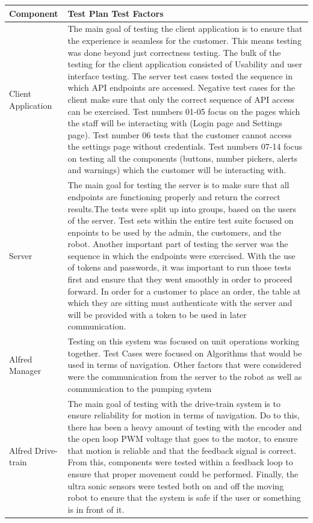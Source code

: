 \documentclass [10pt]{article}
\begin{document}
	\begin{longtable}{| p{} | p{} |}\hline 
				\rowcolor{tableCell}\textbf{Component} & \textbf{Test Plan Test Factors} \\ \hline
		Client Application & The main goal of testing the client application is to ensure that the experience is seamless for the customer. This means testing was done beyond just correctness testing. The bulk of the testing for the client application consisted of Usability and user interface testing. The server test cases tested the sequence in which API endpoints are accessed. Negative test cases for the client make sure that only the correct sequence of API access can be exercised.  Test numbers 01-05 focus on the pages which the staff will be interacting with (Login page and Settings page). Test number 06 tests that the customer cannot access the settings page without credentials. Test numbers 07-14 focus on testing all the components (buttons, number pickers, alerts and warnings) which the customer will be interacting with. \\ \hline
		Server & The main goal for testing the server is to make sure that all endpoints are functioning properly and return the correct results.The tests were split up into groups, based on the users of the server. Test sets within the entire test suite focused on enpoints to be used by the admin, the customers, and the robot. Another important part of testing the server was the sequence in which the endpoints were exercised. With the use of tokens and passwords, it was important to run those tests first and ensure that they went smoothly in order to proceed forward. In order for a customer to place an order, the table at which they are sitting must authenticate with the server and will be provided with a token to be used in later communication. \\ \hline
		Alfred Manager & Testing on this system was focused on unit operations working together. Test Cases were focused on Algorithms that would be used in terms of navigation. Other factors that were considered were the communication from the server to the robot as well as communication to the pumping system \\ \hline
	 	Alfred Drive-train & The main goal of testing with the drive-train system is to ensure reliability for motion in terms of navigation. Do to this, there has been a heavy amount of testing with the encoder and the open loop PWM voltage that goes to the motor, to ensure that motion is reliable and that the feedback signal is correct. From this, components were tested within a feedback loop to ensure that proper movement could be performed. Finally, the ultra sonic sensors were tested both on and off the moving robot to ensure that the system is safe if the user or something is in front of it.\\ \hline	

\end{longtable}
\end{document}
